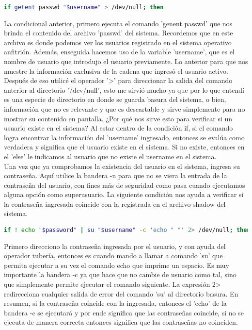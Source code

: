 \documentclass[letter,11pt]{article}
\begin{document}
\begin{lstlisting}[language=sh, label={lst:shellscript}, basicstyle=\small]
if getent passwd "$username" > /dev/null; then
\end{lstlisting}

La condicional anterior, primero ejecuta el comando 'genent passwd' que nos brinda el contenido del archivo 'passwd' del sistema. Recordemos que en este archivo es donde podemos ver los usuarios registrado en el sistema operativo anfitrión. Además, enseguida hacemos uso de la variable 'username', que es el nombre de usuario que introdujo el usuario previamente. Lo anterior para que nos muestre la información exclusiva de la cadena que ingresó el usuario activo. Después de eso utilicé el operador '>' para direccionar la salida del comando anterior al directorio '/dev/null', esto me sirvió mucho ya que por lo que entendí es una especie de directorio en donde se guarda basura del sistema, o bien, información que no es relevante y que es descartable y sirve simplemente para no mostrar su contenido en pantalla. ¿Por qué nos sirve esto para verificar si un usuario existe en el sistema? Al estar dentro de la condición if, si el comando logra encontrar la información del 'username' ingresado, entonces se evalúa como verdadera y significa que el usuario existe en el sistema. Si no existe, entonces en el 'else' le indicamos al usuario que no existe el username en el sistema.\\

Una vez que ya comprobamos la existencia del usuario en el sistema, ingresa su contraseña. Aquí utilice la bandera -n para que no se viera la entrada de la contraseña del usuario, con fines más de seguridad como pasa cuando ejecutamos alguna opción como superusuario. La siguiente condición nos ayuda a verificar si la contraseña ingresada coincide con la registrada en el archivo shadow del sistema.

\begin{lstlisting}[language=sh, label={lst:shellscript}, basicstyle=\small]
if ! echo "$password" | su "$username" -c 'echo " "' 2> /dev/null; then
\end{lstlisting}

Primero direcciono la contraseña ingresada por el usuario, y con ayuda del operador tubería, entonces es cuando mando a llamar a comando 'su' que permita ejecutar a su vez el comando echo que imprime un espacio. Es muy importante la bandera -c ya que hace que no cambie de usuario como tal, sino que simplemente permite ejecutar el comando siguiente. La expresión 2> redirecciona cualquier salida de error del comando 'su' al directorio basura. En resumen, si la contraseña coincide con la ingresada, entonces el 'echo' de la bandera -c se ejecutará y por ende significa que las contraseñas coincide, si no se ejecuta de manera correcta entonces significa que las contraseñas no coinciden. \\
\end{document}
